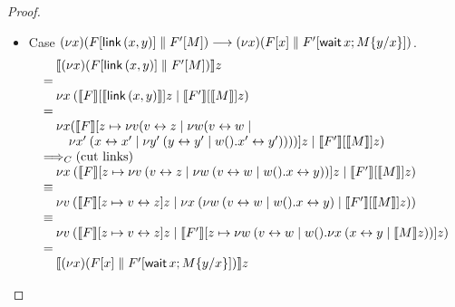 \documentclass[oribibl,orivec,envcountsame]{llncs}
\begin{document}
\begin{proof}
\begin{itemize}
  \item Case $(\nu x) (F[\mathsf{link} \, (x, y)] \parallel F'[M]) \longrightarrow
              (\nu x)(F[x] \parallel F'[\mathsf{wait} \, x; M\{y/x\}])$.
    \[
    \bl
    \quad \tocp{(\nu x) (\Fx[\gvconst{link} \app (x, y)] \parallel \Fx'[M])}z \\
    = \\
    \quad \cut{x}{}
             {\tocp{\Fx}[\tocp{\gvconst{link} \app (x, y)}]z}
             {\tocp{\Fx'}[\tocp{M}]z} \\
    = \\
    \quad \nu x
             (\tocp{\Fx}[z \mapsto
                           \nu v (\link v z \mid
                             \nu w (\link v w \mid \\
    \qquad
                               {\cut{x'}{}
                                 {\link{x}{x'}}
                                 {\cut{y'}{}{\link{y}{y'}}{w().\link{x'}{y'}}}}))]z \mid
             {\tocp{\Fx'}[\tocp{M}]z}) \\
    \bigcrto (\text{cut links}) \\
    \quad \cut{x}{}
             {\tocp{\Fx}[z \mapsto
                           \cut{v}{}{\link v z}
                             {\cut{w}{}{\link v w}
                                {w().\link{x}{y}}}]z}
             {\tocp{\Fx'}[\tocp{M}]z} \\
    \equiv \\
    \quad \cut{v}{}
             {\tocp{\Fx}[z \mapsto \link v z]z}
             {\cut{x}{}
               {\cut{w}{}
                  {\link v w}
                  {w().\link{x}{y}}}
               {\tocp{\Fx'}[\tocp{M}]z}} \\
    \equiv \\
    \quad
      \cut{v}{}
        {\tocp{\Fx}[z \mapsto \link v z]z}
        {\tocp{\Fx'}[z \mapsto
                      \cut{w}{}
                         {\link v w}
                         {w().\cut{x}{}{\link x y}{\tocp{M}z}}]z} \\
    = \\
    \quad \tocp{(\nu x)(\Fx[x] \parallel \Fx'[\gvletunit{\gvconst{wait} \app x}{M\{y/x\}}])}z
    \el
    \]
\end{itemize}
\end{proof}
\end{document}
